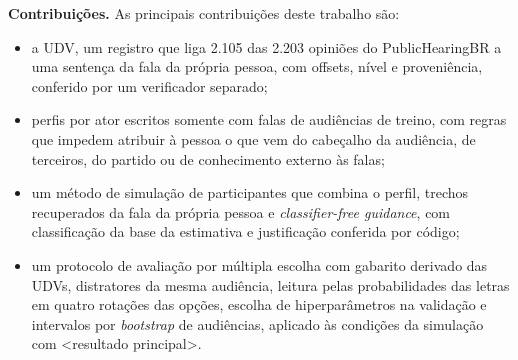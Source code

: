 \medskip\noindent\textbf{Contribui\c{c}\~oes.} As principais contribui\c{c}\~oes deste trabalho s\~ao:
\begin{itemize}
  \itemsep2pt
  \item a UDV, um registro que liga 2.105 das 2.203 opiniões do PublicHearingBR a uma sentença da
  fala da própria pessoa, com offsets, nível e proveniência, conferido por um verificador separado;
  \item perfis por ator escritos somente com falas de audiências de treino, com regras que impedem
  atribuir à pessoa o que vem do cabeçalho da audiência, de terceiros, do partido ou de conhecimento
  externo às falas;
  \item um método de simulação de participantes que combina o perfil, trechos recuperados da fala da
  própria pessoa e \textit{classifier-free guidance}, com classificação da base da estimativa e
  justificação conferida por código;
  \item um protocolo de avaliação por múltipla escolha com gabarito derivado das UDVs, distratores da
  mesma audiência, leitura pelas probabilidades das letras em quatro rotações das opções, escolha de
  hiperparâmetros na validação e intervalos por \textit{bootstrap} de audiências, aplicado às
  condições da simulação com <resultado principal>.
\end{itemize}
